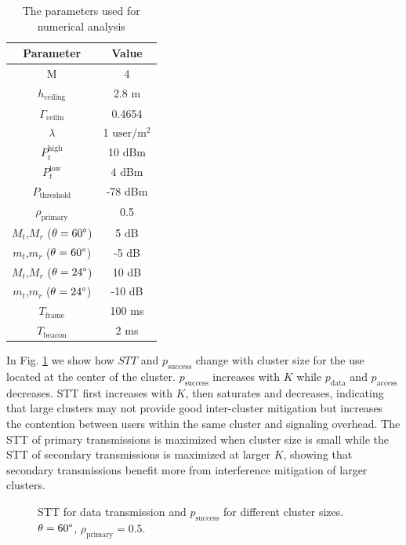 \documentclass[10pt, conference, letterpaper]{IEEEtran}
\begin{document}
\begin{table}
	\centering
	\caption{The parameters used for numerical analysis}
	\begin{tabular}{cc}
		\hline
		Parameter & Value \\
		\hline
		M & 4 \\
		$h_{\mathrm{ceiling}}$ & 2.8 m \\
		$\Gamma_{\mathrm{ceilin}}$ & 0.4654 \\
		$\lambda$ & 1 $\mathrm{user/m^2}$ \\
		$P_t^{\mathrm{high}}$ & 10 dBm \\
		$P_t^{\mathrm{low}}$ & 4 dBm \\
		$P_{\mathrm{threshold}}$ & -78 dBm \\
		$\rho_{\mathrm{primary}}$ & 0.5 \\
		$M_t$,$M_r$ ($\theta = 60\degree$) & 5 dB \\
		$m_t$,$m_r$ ($\theta = 60\degree$) & -5 dB \\
		$M_t$,$M_r$ ($\theta = 24\degree$) & 10 dB \\
		$m_t$,$m_r$ ($\theta = 24\degree$) & -10 dB \\		
		$T_{\mathrm{frame}}$ & 100 ms \\
		$T_{\mathrm{beacon}}$ & 2 ms \\
		\hline
	\end{tabular}
	\label{tab:clusteranalysis:parameter}	
\end{table}

In Fig. \ref{fig:clusteranalysis:basic} we show how $STT$ and $p_{\mathrm{success}}$ change with cluster size for the use located at the center of the cluster.  $p_{\mathrm{success}}$ increases with $K$ while $p_{\mathrm{data}}$ and $p_{\mathrm{access}}$ decreases. STT first increases with $K$, then saturates and decreases, indicating that large clusters may not provide good inter-cluster mitigation but increases the contention between users within the same cluster and signaling overhead. The STT of primary transmissions is maximized when cluster size is small while the STT of secondary transmissions is maximized at larger $K$, showing that secondary transmissions benefit more from interference mitigation of larger clusters.  

\begin{figure}[htp]
	\centering
	
	
	\caption[]{STT for data transmission  and $p_{\mathrm{success}}$  for different cluster sizes. $\theta=60\degree$, $\rho_{\mathrm{primary}} = 0.5$. }
	\label{fig:clusteranalysis:basic}
\end{figure}
\end{document}
